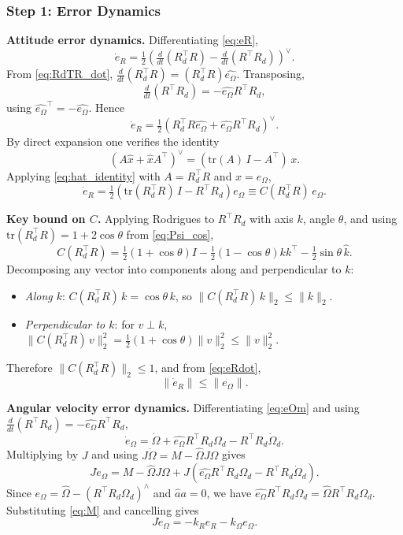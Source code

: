 \documentclass[11pt]{article}
\theoremstyle{remark}
\newcommand{\tr}{\mathrm{tr}}
\newcommand{\hatmap}[1]{\widehat{#1}}
\newcommand{\hatexp}[1]{({#1})^\wedge}
\begin{document}
\subsubsection*{Step 1: Error Dynamics}

\textbf{Attitude error dynamics.} Differentiating \eqref{eq:eR},
\[
\dot{e}_R = \tfrac{1}{2}\left(\tfrac{d}{dt}(R_d^\top R) - \tfrac{d}{dt}(R^\top R_d)\right)^\vee.
\]
From \eqref{eq:RdTR_dot}, $\tfrac{d}{dt}(R_d^\top R) = (R_d^\top R)\hatmap{e_\Omega}$. Transposing,
\[
\tfrac{d}{dt}(R^\top R_d) = -\hatmap{e_\Omega} R^\top R_d,
\]
using $\hatmap{e_\Omega}^\top = -\hatmap{e_\Omega}$. Hence
\[
\dot{e}_R = \tfrac{1}{2}\left(R_d^\top R\hatmap{e_\Omega} + \hatmap{e_\Omega} R^\top R_d\right)^\vee.
\]
By direct expansion one verifies the identity
\begin{equation}
(A\hatmap{x} + \hatmap{x}A^\top)^\vee = (\tr(A)\,I - A^\top)\,x.
\label{eq:hat_identity}
\end{equation}
Applying \eqref{eq:hat_identity} with $A = R_d^\top R$ and $x = e_\Omega$,
\begin{equation}
\dot{e}_R = \tfrac{1}{2}\left(\tr(R_d^\top R)\,I - R^\top R_d\right)e_\Omega \equiv C(R_d^\top R)\,e_\Omega.
\label{eq:eRdot}
\end{equation}

\textbf{Key bound on $C$.} Applying Rodrigues to $R^\top R_d$ with axis $k$, angle $\theta$, and using $\tr(R_d^\top R) = 1+2\cos\theta$ from \eqref{eq:Psi_cos},
\[
C(R_d^\top R) = \tfrac{1}{2}(1+\cos\theta)I - \tfrac{1}{2}(1-\cos\theta)kk^\top - \tfrac{1}{2}\sin\theta\,\hatmap{k}.
\]
Decomposing any vector into components along and perpendicular to $k$:
\begin{itemize}
    \item \textit{Along $k$}: $C(R_d^\top R)\,k = \cos\theta\,k$, so $\|C(R_d^\top R)\,k\|_2 \le \|k\|_2$.
    \item \textit{Perpendicular to $k$}: for $v\perp k$, $\|C(R_d^\top R)\,v\|_2^2 = \tfrac{1}{2}(1+\cos\theta)\|v\|_2^2 \le \|v\|_2^2$.
\end{itemize}
Therefore $\|C(R_d^\top R)\|_2 \leq 1$, and from \eqref{eq:eRdot},
\begin{equation}
\|\dot{e}_R\| \leq \|e_\Omega\|.
\label{eq:eRdot_bound}
\end{equation}

\textbf{Angular velocity error dynamics.} Differentiating \eqref{eq:eOm} and using $\tfrac{d}{dt}(R^\top R_d) = -\hatmap{e_\Omega}R^\top R_d$,
\[
\dot{e}_\Omega = \dot{\Omega} + \hatmap{e_\Omega}R^\top R_d\Omega_d - R^\top R_d\dot{\Omega}_d.
\]
Multiplying by $J$ and using $J\dot{\Omega} = M - \hatmap{\Omega}J\Omega$ gives
\[
J\dot{e}_\Omega = M - \hatmap{\Omega}J\Omega + J(\hatmap{e_\Omega}R^\top R_d\Omega_d - R^\top R_d\dot{\Omega}_d).
\]
Since $\hatmap{e_\Omega} = \hatmap{\Omega} - \hatexp{R^\top R_d\Omega_d}$ and $\hatmap{a}a=0$, we have $\hatmap{e_\Omega}R^\top R_d\Omega_d = \hatmap{\Omega}R^\top R_d\Omega_d$. Substituting \eqref{eq:M} and cancelling gives
\begin{equation}
J\dot{e}_\Omega = -k_R e_R - k_\Omega e_\Omega.
\label{eq:eOmdot}
\end{equation}
\end{document}
